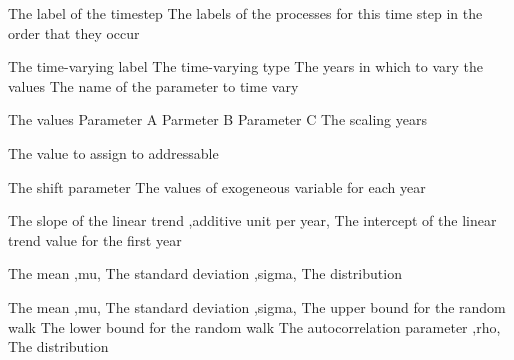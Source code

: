  {The label of the timestep}
 {The labels of the processes for this time step in the order that they occur}
\par\par
{} {The time-varying label}
 {The time-varying type}
 {The years in which to vary the values}
 {The name of the parameter to time vary}
\par\textbf{}\par
{} {The values}
 {Parameter A}
 {Parmeter B}
 {Parameter C}
 {The scaling years}
\par\textbf{}\par
{} {The value to assign to addressable}
\par\textbf{}\par
{} {The shift parameter}
 {The values of exogeneous variable for each year}
\par\textbf{}\par
{} {The slope of the linear trend ,additive unit per year,}
 {The intercept of the linear trend value for the first year}
\par\textbf{}\par
{} {The mean ,mu,}
 {The standard deviation ,sigma,}
 {The distribution}
\par\textbf{}\par
{} {The mean ,mu,}
 {The standard deviation ,sigma,}
 {The upper bound for the random walk}
 {The lower bound for the random walk}
 {The autocorrelation parameter ,rho,}
 {The distribution}
